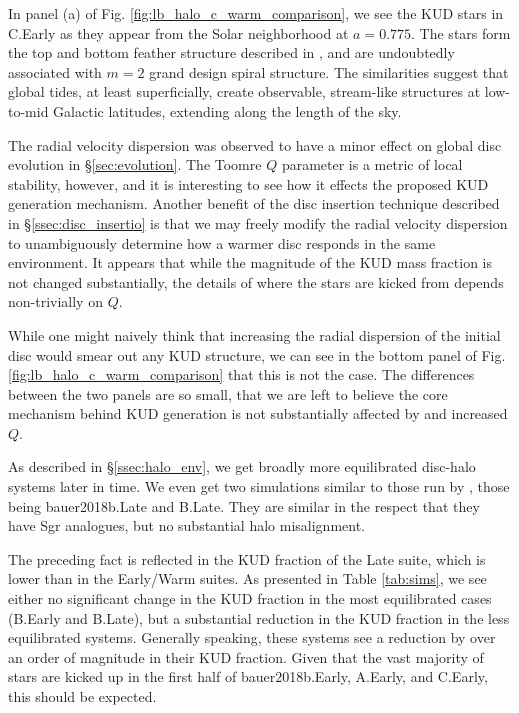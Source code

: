 In panel (a) of Fig. \ref{fig:lb_halo_c_warm_comparison}, we see the KUD stars in C.Early as they appear from the Solar neighborhood at $a=0.775$. The stars form the top and bottom feather structure described in \citet{laporte_2019_feathers}, and are undoubtedly associated with $m=2$ grand design spiral structure. The similarities suggest that global tides, at least superficially, create observable, stream-like structures at low-to-mid Galactic latitudes, extending along the length of the sky.

The radial velocity dispersion was observed to have a minor effect on global disc evolution in \S\ref{sec:evolution}. The Toomre $Q$ parameter is a metric of local stability, however, and it is interesting to see how it effects the proposed KUD generation mechanism. Another benefit of the disc insertion technique described in \S\ref{ssec:disc_insertio} is that we may freely modify the radial velocity dispersion to unambiguously determine how a warmer disc responds in the same environment.  It appears that while the magnitude of the KUD mass fraction is not changed substantially, the details of where the stars are kicked from depends non-trivially on $Q$. 

While one might naively think that increasing the radial dispersion of the initial disc would smear out any KUD structure, we can see in the bottom panel of Fig. \ref{fig:lb_halo_c_warm_comparison} that this is not the case. The differences between the two panels are so small, that we are left to believe the core mechanism behind KUD generation is not substantially affected by and increased $Q$.


As described in \S \ref{ssec:halo_env}, we get broadly more equilibrated disc-halo systems later in time. We even get two simulations similar to those run by \citet{laporte_2016,laporte_2018}, those being bauer2018b.Late and B.Late. They are similar in the respect that they have Sgr analogues, but no substantial halo misalignment. 

The preceding fact is reflected in the KUD fraction of the Late suite, which is lower than in the Early/Warm suites. As presented in Table \ref{tab:sims}, we see either no significant change in the KUD fraction in the most equilibrated cases (B.Early and B.Late), but a substantial reduction in the KUD fraction in the less equilibrated systems. Generally speaking, these systems see a reduction by over an order of magnitude in their KUD fraction. Given that the vast majority of stars are kicked up in the first half of bauer2018b.Early, A.Early, and C.Early, this should be expected.


